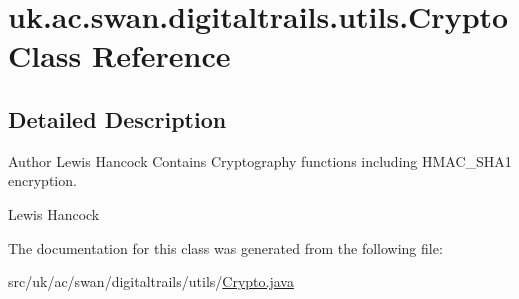 \hypertarget{classuk_1_1ac_1_1swan_1_1digitaltrails_1_1utils_1_1_crypto}{\section{uk.\+ac.\+swan.\+digitaltrails.\+utils.\+Crypto Class Reference}
\label{classuk_1_1ac_1_1swan_1_1digitaltrails_1_1utils_1_1_crypto}
}


\subsection{Detailed Description}
\begin{DoxyAuthor}{Author}
Lewis Hancock Contains Cryptography functions including H\+M\+A\+C\+\_\+\+S\+H\+A1 encryption.

Lewis Hancock 
\end{DoxyAuthor}


The documentation for this class was generated from the following file\+:\begin{DoxyCompactItemize}
\item 
src/uk/ac/swan/digitaltrails/utils/\hyperlink{_crypto_8java}{Crypto.\+java}\end{DoxyCompactItemize}
